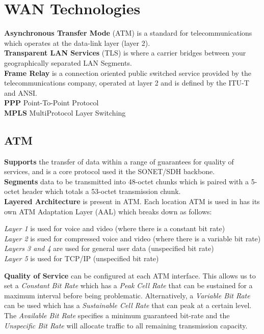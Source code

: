 \documentclass[a4paper,11pt]{article}
\begin{document}
\section{WAN Technologies}
\textbf{Asynchronous Transfer Mode} (ATM) is a standard for telecommunications which operates at the data-link layer (layer 2).\\
\textbf{Transparent LAN Services} (TLS) is where a carrier bridges between your geographically separated LAN Segments.\\
\textbf{Frame Relay} is a connection oriented public switched service provided by the telecommunications company, operated at layer 2 and is defined by the ITU-T and ANSI.\\
\textbf{PPP} Point-To-Point Protocol\\
\textbf{MPLS} MultiProtocol Layer Switching
\subsection{ATM}
\textbf{Supports} the transfer of data within a range of guarantees for quality of services, and is a core protocol used it the SONET/SDH backbone.\\
\textbf{Segments} data to be transmitted into 48-octet chunks which is paired with a 5-octet header which totals a 53-octet transmission chunk.\\
\textbf{Layered Architecture} is present in ATM. Each location ATM is used in has its own ATM Adaptation Layer (AAL) which breaks down as follows:
\begin{adjustwidth}{2em}{1em}
\textit{Layer 1} is used for voice and video (where there is a constant bit rate)\\
\textit{Layer 2} is sued for compressed voice and video (where there is a variable bit rate)\\
\textit{Layers 3 and 4} are used for general user data (unspecified bit rate)\\
\textit{Layer 5} is used for TCP/IP (unspecified bit rate)
\end{adjustwidth}
\textbf{Quality of Service} can be configured at each ATM interface. This allows us to set a \textit{Constant Bit Rate} which has a \textit{Peak Cell Rate} that can be sustained for a maximum interval before being problematic. Alternatively, a \textit{Variable Bit Rate} can be used which has a \textit{Sustainable Cell Rate} that can peak at a certain level. The \textit{Available Bit Rate} specifies a minimum guaranteed bit-rate and the \textit{Unspecific Bit Rate} will allocate traffic to all remaining transmission capacity.
\end{document}
